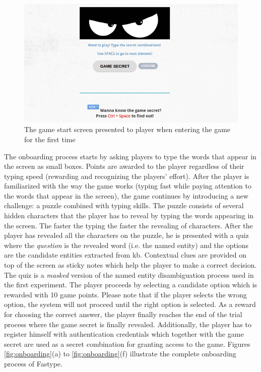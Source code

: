 \begin{figure}[h]
  \includegraphics[width=\linewidth]{figures/experiment2/startscreen-game.png}
  \caption{The game start screen presented to player when entering the game for the first time}
  \label{fig:game-startscreen}
\end{figure}


The onboarding process starts by asking players to type the words that appear in the screen as small boxes. Points are awarded to the player regardless of their typing speed (rewarding and recognizing the players' effort). After the player is familiarized with the way the game works (typing fast while paying attention to the words that appear in the screen), the game continues by introducing a new challenge: a puzzle combined with typing skills. The puzzle consists of several hidden characters that the player has to reveal by typing the words appearing in the screen. The faster the typing the faster the revealing of characters. After the player has revealed all the characters on the puzzle, he is presented with a quiz where the \textit{question} is the revealed word (i.e. the named entity) and the options are the candidate entities extracted from \ac{kb}. Contextual clues are provided on top of the screen as sticky notes which help the player to make a correct decision. The quiz is a \textit{masked} version of the named entity disambiguation process used in the first experiment. The player proceeds by selecting a candidate option which is rewarded with 10 game points. Please note that if the player selects the wrong option, the system will not proceed until the right option is selected. As a reward for choosing the correct answer, the player finally reaches the end of the trial process where the game secret is finally revealed. Additionally, the player has to register himself with authentication credentials which together with the game secret are used as a secret combination for granting access to the game. Figures \ref{fig:onboarding}(a) to  \ref{fig:onboarding}(f) illustrate the complete onboarding process of Fastype. 

